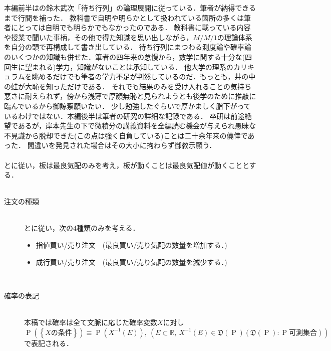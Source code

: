 \documentclass[a4j,papersize,disablejfam,slide,14pt]{jsarticle}
\def\prob#1{\operatorname{P} \left(\left\{ #1 \right\}\right)} %
\begin{document}
    本編前半は\cite{suzuki_queueing}の鈴木武次「待ち行列」の論理展開に従っている．筆者が納得できるまで行間を補った．
    教科書で自明や明らかとして扱われている箇所の多くは筆者にとっては自明でも明らかでもなかったのである．
    教科書に載っている内容や授業で聞いた事柄，その他で得た知識を思い出しながら，$M/M/1$の理論体系を自分の頭で再構成して書き出している．
    待ち行列にまつわる測度論や確率論のいくつかの知識も併せた．筆者の四年来の怠慢から，数学に関する十分な(四回生に望まれる)学力，知識がないことは承知している．
    他大学の理系のカリキュラムを眺めるだけでも筆者の学力不足が判然しているのだ．もっとも，井の中の蛙が大恥を知っただけである．
    それでも結果のみを受け入れることの気持ち悪さに耐えられず，傍から浅薄で厚顔無恥と見られようとも後学のために推敲に臨んでいるから御諒察願いたい．
    少し勉強したぐらいで厚かましく脂下がっているわけではない．本編後半は筆者の研究の詳細な記録である．
    卒研は前途絶望であるが，岸本先生の下で微積分の講義資料を全編読む機会が与えられ愚昧な不見識から脱却できた(この点は強く自負している)ことは二十余年来の僥倖であった．
    間違いを発見された場合はその大小に拘わらず御教示願う．\\
    \mbox{}\\
    \cite{endo_zuo_kishimoto}と\cite{li_hui_endo_kishimoto}に従い，板は最良気配のみを考え，板が動くことは最良気配値が動くこととする．\\
    \mbox{}\\
    \begin{description}
    	\item[注文の種類]\mbox{}\\
     	\cite{endo_zuo_kishimoto}と\cite{li_hui_endo_kishimoto}に従い，次の4種類のみを考える．
    	\begin{itemize}
    		\item 指値買い/売り注文　(最良買い/売り気配の数量を増加する．)
        	\item 成行買い/売り注文　(最良買い/売り気配の数量を減少する．)
    	\end{itemize}
        \mbox{}\\
        \item[確率の表記]\mbox{}\\
        	本稿では確率は全て文脈に応じた確率変数$X$に対し$\prob{\mbox{$X$の条件}} \equiv \operatorname{P}(X^{-1}(E)),
            \ (E \subset \mathbb{R},\ X^{-1}(E) \in \mathfrak{D}(\operatorname{P})(\mathfrak{D}(\operatorname{P}):\operatorname{P}\mbox{可測集合}))$で表記される．
     \end{description}
\end{document}
